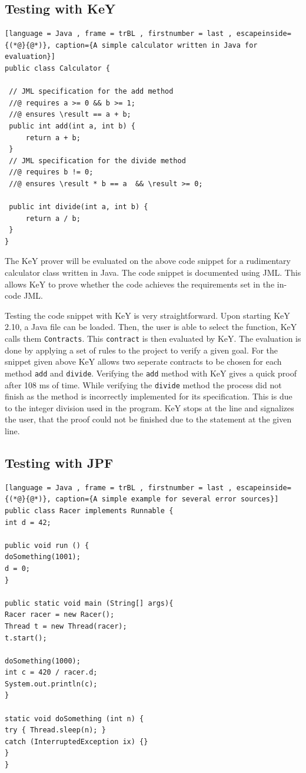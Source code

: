 \subsection{Testing with KeY}
\begin{lstlisting}[language = Java , frame = trBL , firstnumber = last , escapeinside={(*@}{@*)}, caption={A simple calculator written in Java for evaluation}]
public class Calculator {

 // JML specification for the add method
 //@ requires a >= 0 && b >= 1;
 //@ ensures \result == a + b;
 public int add(int a, int b) {
     return a + b;
 }
 // JML specification for the divide method
 //@ requires b != 0;
 //@ ensures \result * b == a  && \result >= 0;

 public int divide(int a, int b) {
     return a / b;
 }
}

\end{lstlisting}

The KeY prover will be evaluated on the above code snippet for a rudimentary calculator class written in Java. The code snippet is documented using JML. This allows KeY to prove whether the code achieves the requirements set in the in-code JML.


Testing the code snippet with KeY is very straightforward. Upon starting KeY 2.10, a Java file can be loaded. Then, the user is able to select the function, KeY calls them \verb|Contracts|. This \verb|contract| is then evaluated by KeY. The evaluation is done by applying a set of rules to the project to verify a given goal. For the snippet given above KeY allows two seperate contracts to be chosen for each method \verb|add| and \verb|divide|. Verifying the \verb|add| method with KeY gives a quick proof after 108 ms of time. While verifying the \verb|divide| method the process did not finish as the method is incorrectly implemented for its specification. This is due to the integer division used in the program. KeY stops at the line and signalizes the user, that the proof could not be finished due to the statement at the given line. 

\subsection{Testing with JPF}
\begin{lstlisting}[language = Java , frame = trBL , firstnumber = last , escapeinside={(*@}{@*)}, caption={A simple example for several error sources}]
public class Racer implements Runnable {
int d = 42;

public void run () {
doSomething(1001);
d = 0;
}

public static void main (String[] args){
Racer racer = new Racer();
Thread t = new Thread(racer);
t.start();

doSomething(1000);
int c = 420 / racer.d;
System.out.println(c);
}

static void doSomething (int n) {
try { Thread.sleep(n); } 
catch (InterruptedException ix) {}
}
}

\end{lstlisting}

